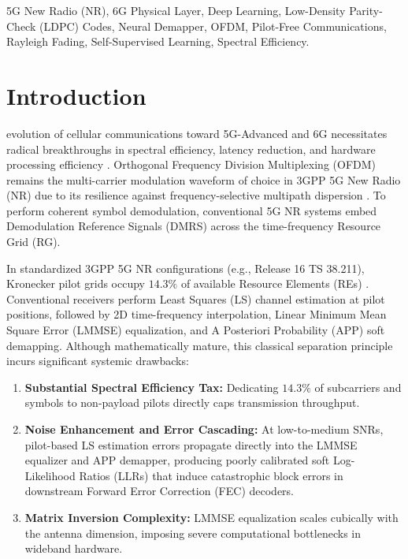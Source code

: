 \documentclass[journal]{IEEEtran}
\begin{document}
\begin{IEEEkeywords}
5G New Radio (NR), 6G Physical Layer, Deep Learning, Low-Density Parity-Check (LDPC) Codes, Neural Demapper, OFDM, Pilot-Free Communications, Rayleigh Fading, Self-Supervised Learning, Spectral Efficiency.
\end{IEEEkeywords}

\section{Introduction}
\label{sec:introduction}
 evolution of cellular communications toward 5G-Advanced and 6G necessitates radical breakthroughs in spectral efficiency, latency reduction, and hardware processing efficiency \cite{dahlman20185g}. Orthogonal Frequency Division Multiplexing (OFDM) remains the multi-carrier modulation waveform of choice in 3GPP 5G New Radio (NR) due to its resilience against frequency-selective multipath dispersion \cite{3gpp38211}. To perform coherent symbol demodulation, conventional 5G NR systems embed Demodulation Reference Signals (DMRS) across the time-frequency Resource Grid (RG).

In standardized 3GPP 5G NR configurations (e.g., Release 16 TS 38.211), Kronecker pilot grids occupy $14.3\%$ of available Resource Elements (REs) \cite{3gpp38211, hoydis2023sionna}. Conventional receivers perform Least Squares (LS) channel estimation at pilot positions, followed by 2D time-frequency interpolation, Linear Minimum Mean Square Error (LMMSE) equalization, and A Posteriori Probability (APP) soft demapping. Although mathematically mature, this classical separation principle incurs significant systemic drawbacks:
\begin{enumerate}
    \item \textbf{Substantial Spectral Efficiency Tax:} Dedicating $14.3\%$ of subcarriers and symbols to non-payload pilots directly caps transmission throughput.
    \item \textbf{Noise Enhancement and Error Cascading:} At low-to-medium SNRs, pilot-based LS estimation errors propagate directly into the LMMSE equalizer and APP demapper, producing poorly calibrated soft Log-Likelihood Ratios (LLRs) that induce catastrophic block errors in downstream Forward Error Correction (FEC) decoders.
    \item \textbf{Matrix Inversion Complexity:} LMMSE equalization scales cubically with the antenna dimension, imposing severe computational bottlenecks in wideband hardware.
\end{enumerate}
\end{document}

